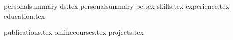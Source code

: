 \documentclass[12pt, a4paper]{awesome-cv}
\newcommand*{\sectiondir}{resume/}
\newcommand{\comment}[1]{}
\newcounter{ds_or_be}
\newcounter{res_cv}
\begin{document}
\makecvheader

{
{personalsummary-ds.tex}
}
{
{personalsummary-be.tex}
}
{skills.tex}
{experience.tex}
{education.tex}
\comment{\pagebreak}

{publications.tex}
{onlinecourses.tex}
{projects.tex}
\end{document}

